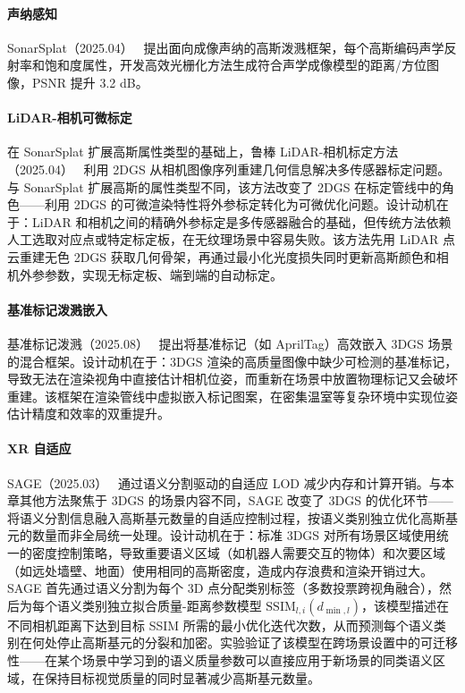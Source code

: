 \paragraph{声纳感知}

SonarSplat（2025.04）~\cite{2504_00159} 提出面向成像声纳的高斯泼溅框架，每个高斯编码声学反射率和饱和度属性，开发高效光栅化方法生成符合声学成像模型的距离/方位图像，PSNR 提升 3.2 dB。

\paragraph{LiDAR-相机可微标定}

在 SonarSplat 扩展高斯属性类型的基础上，鲁棒 LiDAR-相机标定方法（2025.04）~\cite{2504_00525} 利用 2DGS 从相机图像序列重建几何信息解决多传感器标定问题。与 SonarSplat 扩展高斯的属性类型不同，该方法改变了 2DGS 在标定管线中的角色——利用 2DGS 的可微渲染特性将外参标定转化为可微优化问题。设计动机在于：LiDAR 和相机之间的精确外参标定是多传感器融合的基础，但传统方法依赖人工选取对应点或特定标定板，在无纹理场景中容易失败。该方法先用 LiDAR 点云重建无色 2DGS 获取几何骨架，再通过最小化光度损失同时更新高斯颜色和相机外参参数，实现无标定板、端到端的自动标定。

\paragraph{基准标记泼溅嵌入}

基准标记泼溅（2025.08）~\cite{2508_17012} 提出将基准标记（如 AprilTag）高效嵌入 3DGS 场景的混合框架。设计动机在于：3DGS 渲染的高质量图像中缺少可检测的基准标记，导致无法在渲染视角中直接估计相机位姿，而重新在场景中放置物理标记又会破坏重建。该框架在渲染管线中虚拟嵌入标记图案，在密集温室等复杂环境中实现位姿估计精度和效率的双重提升。

\paragraph{XR 自适应}

SAGE（2025.03）~\cite{2503_16747} 通过语义分割驱动的自适应 LOD 减少内存和计算开销。与本章其他方法聚焦于 3DGS 的场景内容不同，SAGE 改变了 3DGS 的优化环节——将语义分割信息融入高斯基元数量的自适应控制过程，按语义类别独立优化高斯基元的数量而非全局统一处理。设计动机在于：标准 3DGS 对所有场景区域使用统一的密度控制策略，导致重要语义区域（如机器人需要交互的物体）和次要区域（如远处墙壁、地面）使用相同的高斯密度，造成内存浪费和渲染开销过大。SAGE 首先通过语义分割为每个 3D 点分配类别标签（多数投票跨视角融合），然后为每个语义类别独立拟合质量-距离参数模型 $\text{SSIM}_{l,i}(d_{\min,l})$，该模型描述在不同相机距离下达到目标 SSIM 所需的最小优化迭代次数，从而预测每个语义类别在何处停止高斯基元的分裂和加密。实验验证了该模型在跨场景设置中的可迁移性——在某个场景中学习到的语义质量参数可以直接应用于新场景的同类语义区域，在保持目标视觉质量的同时显著减少高斯基元数量。

